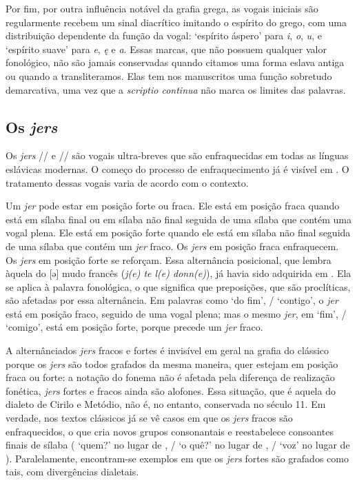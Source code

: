 Por fim, por outra influência notável da grafia grega, as vogais iniciais são
regularmente recebem um sinal diacrítico imitando o espírito do grego, com uma
distribuição dependente da função da vogal: `espírito áspero' para \emph{i},
\emph{o}, \emph{u},  e `espírito suave' para \emph{e}, \emph{ę} e
\emph{a}.
Essas marcas, que não possuem qualquer valor fonológico, não são jamais
conservadas quando citamos uma forma eslava antiga ou quando a transliteramos.
Elas tem nos manuscritos uma função sobretudo demarcativa, uma vez que a
\emph{scriptio continua} não marca os limites das palavras.

\subsection{Os \emph{jers}}\label{sec:jers}

Os \emph{jers} /\jeri{}/ e /\jeru{}/ são vogais ultra\hyp{}breves que são
enfraquecidas em todas as línguas eslávicas modernas.
O começo do processo de enfraquecimento já é visível em .
O tratamento dessas vogais varia de acordo com o contexto.

Um \emph{jer} pode estar em posição forte ou fraca.
Ele está em posição fraca quando está em sílaba final ou em sílaba não final
seguida de uma sílaba que contém uma vogal plena.
Ele está em posição forte quando ele está em sílaba não final seguida de uma
sílaba que contém um \emph{jer} fraco.
Os \emph{jers} em posição fraca enfraquecem.
Os \emph{jers} em posição forte se reforçam.
Essa alternância posicional, que lembra àquela do [ə] mudo francês (\emph{j{(e)}
	te l{(e)} donn{(e)}}), já havia sido adquirida em .
Ela se aplica à palavra fonológica, o que significa que preposições, que são
proclíticas, são afetadas por essa alternância.
Em palavras como   `do
fim', \slash{} `contigo', o \emph{jer} está
em posição fraco, seguido de uma vogal plena; mas o mesmo \emph{jer}, em
  `fim', \slash{} `comigo', está em posição forte, porque precede
um \emph{jer} fraco.

A alternânciados \emph{jers} fracos e fortes é invisível em geral na grafia do
 clássico porque os \emph{jers} são todos grafados da mesma
maneira, quer estejam em posição fraca ou forte: a notação do fonema não é
afetada pela diferença de realização fonética, \emph{jers} fortes e fracos ainda
são alofones.
Essa situação, que é aquela do dialeto de Cirilo e Metódio, não é, no entanto,
conservada no século 11.
Em verdade, nos textos clássicos já se vê casos em que os \emph{jers} fracos são
enfraquecidos, o que cria novos grupos consonantais e reestabelece consoantes
finais de sílaba ( `quem?' no lugar de
, \slash{} `o quê?' no
lugar de , \slash{}
`voz' no lugar de ).
Paralelamente, encontram-se exemplos em que os \emph{jers} fortes são grafados
como tais, com divergências dialetais.

